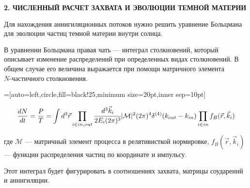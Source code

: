 \newpage
\begin{center}
	\textbf{\large 2. ЧИСЛЕННЫЙ РАСЧЕТ ЗАХВАТА И ЭВОЛЮЦИИ ТЕМНОЙ МАТЕРИИ}
\end{center}


Для нахождения аннигиляционных потоков нужно решить уравнение Больцмана для 
эволюции частиц темной материи внутри солнца.

В уравнении Больцмана правая чать --- интеграл столкновений, 
который описывает изменение распределений при определенных видах столкновений.
В общем случае его величина выражается при помощи матричного элемента \\
$N$-частичного столкновения.

=[auto=left,circle,fill=black!25,minimum size=20pt,inner sep=10pt]

\begin{equation}
	\label{st_common}
	\frac{dN}{dt} = \frac{P}{T} = \int d^3\vec{r} \prod_{i \in in,out} \cfrac{d^3\vec{k}_i}{2 E_i (2\pi)^3} |\mathcal{M}|^2 (2\pi)^4 \delta^{(4)}(k_{out} - k_{in}) \prod_{i \in in} f_B(\vec{r},\vec{k}_i)
\end{equation}

где $\mathcal{M}$ ---  матричный элемент процесса в релятивисткой нормировке,
$f_B(\vec{r},\vec{k}_i)$ --- функции распределения частиц по координате и импульсу.

Этот интеграл будет фигурировать в соотношениях захвата, матрицы соударений и аннигиляции.

